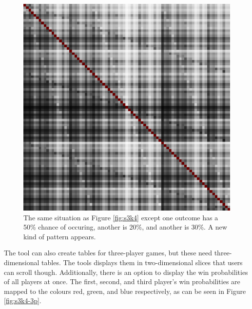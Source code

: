 \documentclass[english,12pt,a4paper,final]{article}
\begin{document}
\begin{figure} [H]
	\centering
	\includegraphics[width=0.9\linewidth]{"s3k4 uneven"}
	\caption{The same situation as Figure \ref{fig:s3k4} except one outcome has a 50\% chance of occuring, another is 20\%, and another is 30\%. A new kind of pattern appears.}
	\label{fig:s3k4-uneven}
\end{figure}

The tool can also create tables for three-player games, but these need three-dimensional tables. The tools displays them in two-dimensional slices that users can scroll though. Additionally, there is an option to display the win probabilities of all players at once. The first, second, and third player's win probabilities are mapped to the colours red, green, and blue respectively, as can be seen in Figure \ref{fig:s3k4-3p}.
\end{document}

